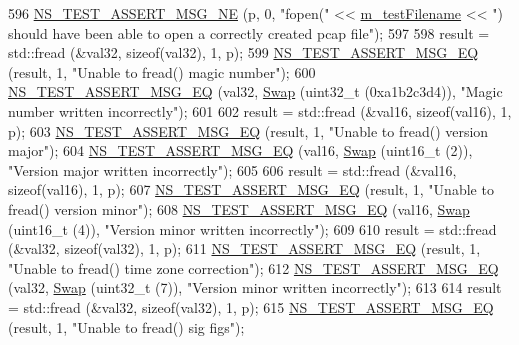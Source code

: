 \begin{DoxyCode}
596   \hyperlink{group__testing_ga73d66fb0050a5111453fd144e767b91a}{NS\_TEST\_ASSERT\_MSG\_NE} (p, 0, \textcolor{stringliteral}{"fopen("} << \hyperlink{classFileHeaderTestCase_a4ab3078ae75680fcc90a3eca9f273cd2}{m\_testFilename} << \textcolor{stringliteral}{") should
       have been able to open a correctly created pcap file"});
597 
598   result = std::fread (&val32, \textcolor{keyword}{sizeof}(val32), 1, p);
599   \hyperlink{group__testing_ga2a9d78cffb3db8e867c35fff0b698cf5}{NS\_TEST\_ASSERT\_MSG\_EQ} (result, 1, \textcolor{stringliteral}{"Unable to fread() magic number"});
600   \hyperlink{group__testing_ga2a9d78cffb3db8e867c35fff0b698cf5}{NS\_TEST\_ASSERT\_MSG\_EQ} (val32, \hyperlink{pcap-file-test-suite_8cc_a9baeceaeb66adfc7bddae33a81ad8fa7}{Swap} (uint32\_t (0xa1b2c3d4)), \textcolor{stringliteral}{"Magic number
       written incorrectly"});
601 
602   result = std::fread (&val16, \textcolor{keyword}{sizeof}(val16), 1, p);
603   \hyperlink{group__testing_ga2a9d78cffb3db8e867c35fff0b698cf5}{NS\_TEST\_ASSERT\_MSG\_EQ} (result, 1, \textcolor{stringliteral}{"Unable to fread() version major"});
604   \hyperlink{group__testing_ga2a9d78cffb3db8e867c35fff0b698cf5}{NS\_TEST\_ASSERT\_MSG\_EQ} (val16, \hyperlink{pcap-file-test-suite_8cc_a9baeceaeb66adfc7bddae33a81ad8fa7}{Swap} (uint16\_t (2)), \textcolor{stringliteral}{"Version major written
       incorrectly"});
605 
606   result = std::fread (&val16, \textcolor{keyword}{sizeof}(val16), 1, p);
607   \hyperlink{group__testing_ga2a9d78cffb3db8e867c35fff0b698cf5}{NS\_TEST\_ASSERT\_MSG\_EQ} (result, 1, \textcolor{stringliteral}{"Unable to fread() version minor"});
608   \hyperlink{group__testing_ga2a9d78cffb3db8e867c35fff0b698cf5}{NS\_TEST\_ASSERT\_MSG\_EQ} (val16, \hyperlink{pcap-file-test-suite_8cc_a9baeceaeb66adfc7bddae33a81ad8fa7}{Swap} (uint16\_t (4)), \textcolor{stringliteral}{"Version minor written
       incorrectly"});
609 
610   result = std::fread (&val32, \textcolor{keyword}{sizeof}(val32), 1, p);
611   \hyperlink{group__testing_ga2a9d78cffb3db8e867c35fff0b698cf5}{NS\_TEST\_ASSERT\_MSG\_EQ} (result, 1, \textcolor{stringliteral}{"Unable to fread() time zone correction"});
612   \hyperlink{group__testing_ga2a9d78cffb3db8e867c35fff0b698cf5}{NS\_TEST\_ASSERT\_MSG\_EQ} (val32, \hyperlink{pcap-file-test-suite_8cc_a9baeceaeb66adfc7bddae33a81ad8fa7}{Swap} (uint32\_t (7)), \textcolor{stringliteral}{"Version minor written
       incorrectly"});
613 
614   result = std::fread (&val32, \textcolor{keyword}{sizeof}(val32), 1, p);
615   \hyperlink{group__testing_ga2a9d78cffb3db8e867c35fff0b698cf5}{NS\_TEST\_ASSERT\_MSG\_EQ} (result, 1, \textcolor{stringliteral}{"Unable to fread() sig figs"});

\end{DoxyCode}
